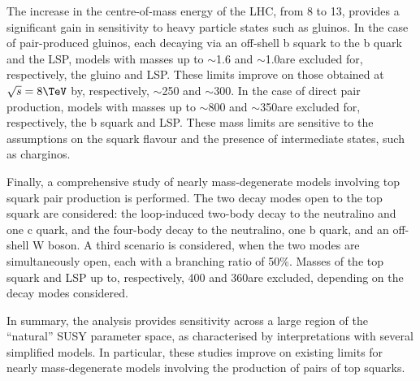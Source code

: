 The increase in the centre-of-mass energy of the LHC, from 8 to
13\TeV, provides a significant gain in sensitivity to heavy particle
states such as gluinos. In the case of pair-produced gluinos, each
decaying via an off-shell b squark to the b quark and the LSP, models
with masses up to $\sim$1.6 and $\sim$1.0\TeV are excluded for,
respectively, the gluino and LSP. These limits improve on those
obtained at $\sqrt{s} = 8\TeV$ by, respectively, $\sim$250 and
$\sim$300\GeV. In the case of direct pair production, models with
masses up to $\sim$800 and $\sim$350\GeV are excluded for,
respectively, the b squark and LSP. These mass limits are sensitive to
the assumptions on the squark flavour and the presence of intermediate
states, such as charginos.

Finally, a comprehensive study of nearly mass-degenerate models
involving top squark pair production is performed. The two decay modes
open to the top squark are considered: the loop-induced two-body decay
to the neutralino and one c quark, and the four-body decay to the
neutralino, one b quark, and an off-shell W boson. A third scenario is
considered, when the two modes are simultaneously open, each with a
branching ratio of 50\%. Masses of the top squark and LSP up to,
respectively, 400 and 360\GeV are excluded, depending on the decay
modes considered.

In summary, the analysis provides sensitivity across a large region of
the ``natural'' SUSY parameter space, as characterised by
interpretations with several simplified models. In particular, these
studies improve on existing limits for nearly mass-degenerate models
involving the production of pairs of top squarks.
